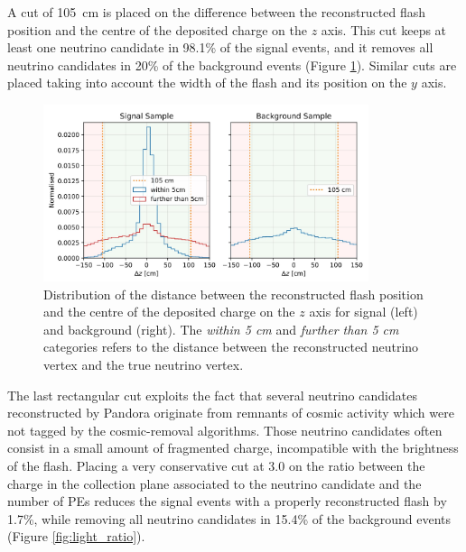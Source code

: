 A cut of \SI{105}{\cm} is placed on the difference between the reconstructed flash position and the centre of the deposited charge on the $z$ axis. This cut keeps at least one neutrino candidate in 98.1\% of the signal events, and it removes all neutrino candidates in 20\% of the background events (Figure \ref{fig:z_cut}). 
Similar cuts are placed taking into account the width of the flash and its position on the $y$ axis. 

\begin{figure}[htbp]
\centering
\includegraphics[width=0.85\textwidth]{figures/z_cut.jpg} 
\caption{Distribution of the distance between the reconstructed flash position and the centre of the deposited charge on the $z$ axis for signal (left) and background (right). The \emph{within 5 cm} and \emph{further than 5 cm} categories refers to the distance between the reconstructed neutrino vertex and the true neutrino vertex.} 
\label{fig:z_cut}
\end{figure}

The last rectangular cut exploits the fact that several neutrino candidates reconstructed by Pandora originate from remnants of cosmic activity which were not tagged by the cosmic-removal algorithms. Those neutrino candidates often consist in a small amount of fragmented charge, incompatible with the brightness of the flash. Placing a very conservative cut at 3.0 on the ratio between the charge in the collection plane associated to the neutrino candidate and the number of PEs reduces the signal events with a properly reconstructed flash by 1.7\%, while removing all neutrino candidates in 15.4\% of the background events (Figure \ref{fig:light_ratio}).

